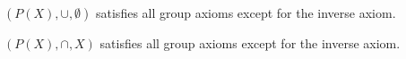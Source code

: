 

$(P(X), \cup, \emptyset)$ satisfies all group axioms except for the inverse axiom.

$(P(X), \cap, X)$ satisfies all group axioms except for the inverse axiom.



